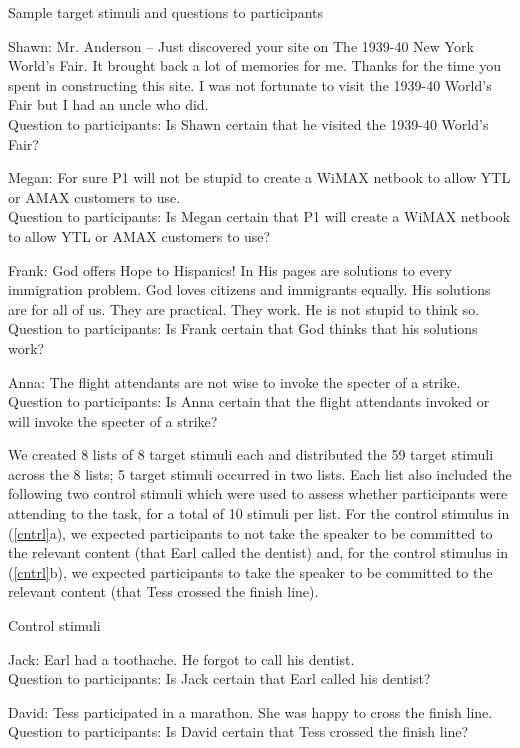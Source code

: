 \documentclass[11pt,fleqn]{article}
\newcommand{\6}{\mbox{$[\hspace*{-.6mm}[$}}
\newcommand{\9}{\mbox{$]\hspace*{-.6mm}]$}}
\begin{document}
\begin{exe} \ex\label{target1} Sample target stimuli and questions to
participants 

\begin{xlist} 

\ex Shawn: Mr. Anderson --  Just discovered your
site on The 1939-40 New York World's Fair. It brought back a lot of
memories for me. Thanks for the time you spent in constructing this
site. I was not fortunate to visit the 1939-40 World's Fair but I
had an uncle who did.
\\ Question to participants: Is Shawn certain that he visited the 1939-40 World's Fair?

\ex Megan: For sure P1 will not be stupid to create a WiMAX netbook to allow YTL or AMAX customers to use.
\\ Question to participants: Is Megan certain that P1 will create a WiMAX netbook to allow YTL or AMAX customers to use?

\ex Frank: God offers Hope to Hispanics! In His pages are solutions to every immigration problem. God loves citizens and immigrants equally. His solutions are for all of us. They are practical. They work. He is not stupid to think so.
\\ Question to participants: Is Frank certain that God thinks that his solutions work?

\ex Anna: The flight attendants are not wise to invoke the specter
of a strike. \\ Question to participants: Is Anna certain that the
flight attendants invoked or will invoke the specter of a strike?

\end{xlist}
\end{exe}

We created 8 lists of 8 target stimuli each and distributed the 59 target stimuli across the 8 lists; 5 target stimuli occurred in two lists. Each list also included the following
two control stimuli which were used to assess whether
participants were attending to the task, for a total of 10 stimuli per list. For the control stimulus in (\ref{cntrl}a), we expected participants to not take the speaker to be committed to the relevant content (that Earl called the dentist) and, for the control stimulus in (\ref{cntrl}b), we expected participants to take the speaker to be committed to the relevant content (that Tess crossed the finish line).

\begin{exe}
\ex\label{cntrl} Control stimuli
\begin{xlist}
\ex Jack: Earl had a toothache. He forgot to call his dentist. \\ Question to participants: Is Jack certain that Earl called his dentist?

\ex  David: Tess participated in a marathon. She was happy to cross
the finish line. \\ Question to participants: Is David certain that Tess
crossed the finish line? \end{xlist} \end{exe}
\end{document}
